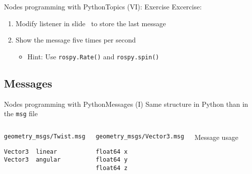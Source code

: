 \documentclass[10pt,compress]{beamer} %
\begin{document}
\begin{frame}{Nodes programming with Python}{Topics (VI): Exercise}
	Excercise:
	\begin{enumerate}
		\item Modify listener in slide~\pageref{listener} to store the last message
		\item Show the message five times per second
		\begin{itemize}
			\item Hint: Use \texttt{rospy.Rate()} and \texttt{rospy.spin()}
		\end{itemize}
	\end{enumerate}
\end{frame}

\subsection{Messages}
\begin{frame}[fragile]{Nodes programming with Python}{Messages (I)}
	Same structure in Python than in the \texttt{msg} file
    \begin{columns}
	\begin{exampleblock}{\texttt{geometry\_msgs/Twist.msg}}
	\begin{verbatim}
Vector3  linear
Vector3  angular
\end{verbatim}
	\end{exampleblock}
	\begin{exampleblock}{\texttt{geometry\_msgs/Vector3.msg}}
	\begin{verbatim}
float64 x
float64 y
float64 z
\end{verbatim}
	\end{exampleblock}
    \vspace{-0.2cm}
	\begin{block}{Message usage}
    \vspace{-0.2cm}
        
    \vspace{-0.2cm}
	\end{block}
	\end{columns}
\end{frame}
\end{document}
